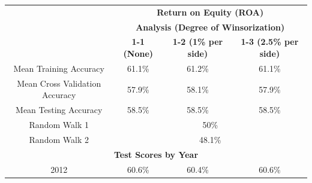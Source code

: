 {{\begin{table}[htb]
\centering
\begin{tabular}{cccc}
\textbf{}                                            & \multicolumn{3}{c}{\textbf{Return on Equity (ROA)}}                                                                                              \\ \cline{2-4} 
\multicolumn{1}{c|}{}                                & \multicolumn{3}{c|}{\textbf{Analysis (Degree of Winsorization)}}                                                                                 \\ \cline{2-4} 
\multicolumn{1}{c|}{}                                & \multicolumn{1}{c|}{\textbf{1-1 (None)}} & \multicolumn{1}{c|}{\textbf{1-2 (1\% per side)}} & \multicolumn{1}{c|}{\textbf{1-3 (2.5\% per side)}} \\ \hline
\multicolumn{1}{|c|}{Mean Training Accuracy}         & \multicolumn{1}{c|}{61.1\%}              & \multicolumn{1}{c|}{61.2\%}                      & \multicolumn{1}{c|}{61.1\%}                        \\ \hline
\multicolumn{1}{|c|}{Mean Cross Validation Accuracy} & \multicolumn{1}{c|}{57.9\%}              & \multicolumn{1}{c|}{58.1\%}                      & \multicolumn{1}{c|}{57.9\%}                        \\ \hline
\multicolumn{1}{|c|}{Mean Testing Accuracy}          & \multicolumn{1}{c|}{58.5\%}              & \multicolumn{1}{c|}{58.5\%}                      & \multicolumn{1}{c|}{58.5\%}                        \\ \hline
\multicolumn{1}{|c|}{Random Walk 1}                  & \multicolumn{3}{c|}{50\%}                                                                                                                        \\ \hline
\multicolumn{1}{|c|}{Random Walk 2}                  & \multicolumn{3}{c|}{48.1\%}                                                                                                                      \\ \hline
\multicolumn{4}{|c|}{\textbf{Test Scores by Year}}                                                                                                                                                      \\ \hline
\multicolumn{1}{|c|}{2012}                           & \multicolumn{1}{c|}{60.6\%}              & \multicolumn{1}{c|}{60.4\%}                      & \multicolumn{1}{c|}{60.6\%}                        \\ \hline

\end{tabular}
\end{table}}}
